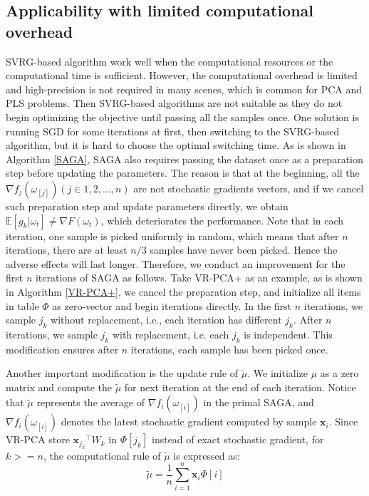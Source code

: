 \documentclass[conference]{IEEEtran}
\begin{document}
 \subsection{Applicability with limited computational overhead }
 SVRG-based algorithm work well when the computational resources or the computational time is sufficient. 
 However, the computational overhead is limited and high-precision is not required in many scenes, which is common for PCA and PLS problems.
 Then SVRG-based algorithms are not suitable as they do not begin optimizing the objective until passing all the samples once. One solution is running SGD for some iterations at first, then switching to the SVRG-based algorithm, but it is hard to choose the optimal switching time. 
 As is shown in Algorithm \ref{SAGA}, SAGA also requires passing the dataset once as a preparation step before updating the parameters. The reason is that at the beginning,  all the $\nabla f_j(\omega_{[j]}) (j \in 1,2,...,n)$ are not stochastic gradients vectors, and if we cancel such preparation step and update parameters directly, we obtain $\mathbb{E}[g_k | \omega_t] \neq \nabla F(\omega_{t})$, which deteriorates the performance.
 Note that in each iteration, one sample is picked uniformly in random, which means that after $n$ iterations, there are at least $n/3$ samples have never been picked. Hence the adverse effects will last longer. 
 Therefore, we conduct an improvement for the first $n$ iterations of SAGA as follows.
 Take VR-PCA+ as an example, as is shown in Algorithm \ref{VR-PCA+}, we cancel the preparation step, and initialize all items in table $\Phi$ as zero-vector and begin iterations directly.
 In the first $n$ iterations, we sample $j_k$ without replacement, i.e., each iteration has different $j_k$. After $n$ iterations, we sample $j_k$ with replacement, i.e. each $j_k$ is independent. This modification ensures after $n$ iterations, each sample has been picked once.
 
 Another important modification is the update rule of $\tilde{\mu}$.
 We initialize $\mu$ as a zero matrix and compute the $\tilde{\mu}$ for next iteration  at the end of each iteration.
 Notice that $\tilde{\mu}$ represents the average of $\nabla f_i(\omega_{[i]})$ in the primal SAGA, and $\nabla f_i(\omega_{[i]})$ denotes the latest stochastic gradient computed by sample $\mathbf{x}_i$. 
 Since VR-PCA store ${\mathbf{x}_{j_k}}^{\top}W_k$ in $\Phi[j_k]$ instead of exact stochastic gradient, for $k>=n$, the computational rule of $\tilde{\mu}$ is expressed as:
 \begin{equation}
 \label{k>=n}
 \tilde{\mu} = \frac{1}{n} \sum\limits_{i=1}^{n}\mathbf{x}_{i}\Phi[i]
 \end{equation}
 
\end{document}
